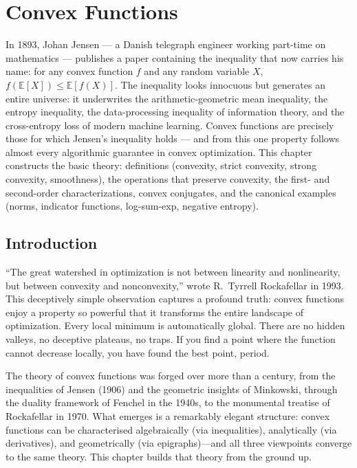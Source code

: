 \chapter{Convex Functions}
\label{ch:convex_functions}

In 1893, Johan Jensen --- a Danish telegraph engineer working part-time on mathematics --- publishes a paper containing the inequality that now carries his name: for any convex function $f$ and any random variable $X$, $f(\mathbb{E}[X]) \leq \mathbb{E}[f(X)]$. The inequality looks innocuous but generates an entire universe: it underwrites the arithmetic-geometric mean inequality, the entropy inequality, the data-processing inequality of information theory, and the cross-entropy loss of modern machine learning. Convex functions are precisely those for which Jensen's inequality holds --- and from this one property follows almost every algorithmic guarantee in convex optimization. This chapter constructs the basic theory: definitions (convexity, strict convexity, strong convexity, smoothness), the operations that preserve convexity, the first- and second-order characterizations, convex conjugates, and the canonical examples (norms, indicator functions, log-sum-exp, negative entropy).

\section{Introduction}

``The great watershed in optimization is not between linearity and nonlinearity, but between convexity and nonconvexity,'' wrote R.~Tyrrell Rockafellar in 1993. This deceptively simple observation captures a profound truth: convex functions enjoy a property so powerful that it transforms the entire landscape of optimization. Every local minimum is automatically global. There are no hidden valleys, no deceptive plateaus, no traps. If you find a point where the function cannot decrease locally, you have found the best point, period.

The theory of convex functions was forged over more than a century, from the inequalities of Jensen (1906) and the geometric insights of Minkowski, through the duality framework of Fenchel in the 1940s, to the monumental treatise of Rockafellar in 1970. What emerges is a remarkably elegant structure: convex functions can be characterised algebraically (via inequalities), analytically (via derivatives), and geometrically (via epigraphs)---and all three viewpoints converge to the same theory. This chapter builds that theory from the ground up.

